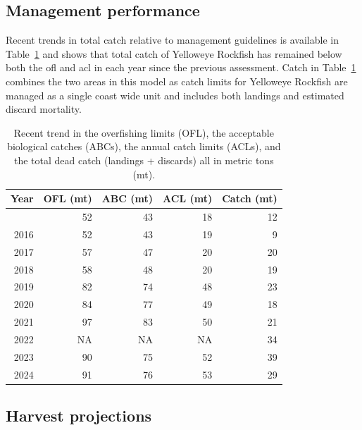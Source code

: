 \documentclass[
]{scrartcl}
\begin{document}
\clearpage

\subsection*{Management performance}\label{management-performance}

Recent trends in total catch relative to management guidelines is
available in Table~\ref{tbl-es-management} and shows that total catch of
Yelloweye Rockfish has remained below both the \gls{ofl} and \gls{acl}
in each year since the previous assessment. Catch in
Table~\ref{tbl-es-management} combines the two areas in this model as
catch limits for Yelloweye Rockfish are managed as a single coast wide
unit and includes both landings and estimated discard mortality.

\begingroup
\fontsize{9.0pt}{10.8pt}\selectfont

\begin{longtable}{rrrrr}

\caption{\label{tbl-es-management}Recent trend in the overfishing limits
(OFL), the acceptable biological catches (ABCs), the annual catch limits
(ACLs), and the total dead catch (landings + discards) all in metric
tons (mt).}

\tabularnewline

\toprule
Year & OFL (mt) & ABC (mt) & ACL (mt) & Catch (mt) \\ 
\midrule\addlinespace[2.5pt]
2015 & 52 & 43 & 18 & 12 \\ 
2016 & 52 & 43 & 19 & 9 \\ 
2017 & 57 & 47 & 20 & 20 \\ 
2018 & 58 & 48 & 20 & 19 \\ 
2019 & 82 & 74 & 48 & 23 \\ 
2020 & 84 & 77 & 49 & 18 \\ 
2021 & 97 & 83 & 50 & 21 \\ 
2022 & NA & NA & NA & 34 \\ 
2023 & 90 & 75 & 52 & 39 \\ 
2024 & 91 & 76 & 53 & 29 \\ 
\bottomrule

\end{longtable}

\endgroup

\subsection*{Harvest projections}\label{harvest-projections}
\end{document}
